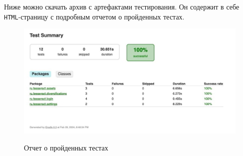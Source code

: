 \documentclass[a4paper, 14pt]{article}
\begin{document}
Ниже можно скачать архив с артефактами тестирования. Он содержит в себе \texttt{HTML}-страницу с подробным отчетом о пройденных тестах.

\begin{figure}[H]
    \centering
    \includegraphics[width=15cm]{resources/3.jpg}\\
    \caption{Отчет о пройденных тестах}
\end{figure}
\end{document}
